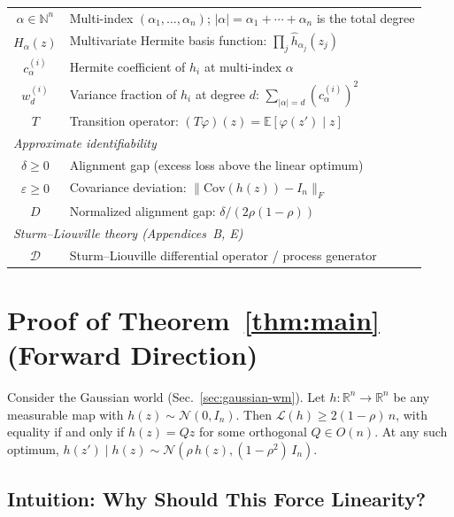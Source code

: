 {\begin{center}
\begin{tabular}{cl}
$\alpha \in \mathbb{N}^n$ & Multi-index $(\alpha_1, \ldots, \alpha_n)$; $|\alpha| = \alpha_1 + \cdots + \alpha_n$ is the total degree \\
$H_\alpha(z)$ & Multivariate Hermite basis function: $\prod_j \hat{h}_{\alpha_j}(z_j)$ \\
$c_\alpha^{(i)}$ & Hermite coefficient of $h_i$ at multi-index $\alpha$ \\
$w_d^{(i)}$ & Variance fraction of $h_i$ at degree $d$: $\sum_{|\alpha|=d} (c_\alpha^{(i)})^2$ \\
$T$ & Transition operator: $(T\varphi)(z) = \mathbb{E}[\varphi(z') \mid z]$ \\
\midrule
\multicolumn{2}{l}{\textit{Approximate identifiability}} \\
$\delta \geq 0$ & Alignment gap (excess loss above the linear optimum) \\
$\varepsilon \geq 0$ & Covariance deviation: $\|\mathrm{Cov}(h(z)) - I_n\|_F$ \\
$D$ & Normalized alignment gap: $\delta / (2\rho(1-\rho))$ \\
\midrule
\multicolumn{2}{l}{\textit{Sturm--Liouville theory (Appendices~B, E)}} \\
$\mathcal{D}$ & Sturm--Liouville differential operator / process generator \\
\bottomrule
\end{tabular}
\end{center}
}







\section{Proof of Theorem~\ref{thm:main} (Forward Direction)}\label{app:proof-forward}

\begin{theoremrestate}
Consider the Gaussian world (Sec.~\ref{sec:gaussian-wm}). Let $h: \mathbb{R}^n \to \mathbb{R}^n$ be any measurable map with $h(z) \sim \mathcal{N}(0, I_n)$. Then $\mathcal{L}(h) \geq 2(1-\rho)\,n$, with equality if and only if $h(z) = Qz$ for some orthogonal $Q \in O(n)$. At any such optimum, $h(z') \mid h(z) \sim \mathcal{N}(\rho\, h(z), (1-\rho^2)\,I_n)$.
\end{theoremrestate}


\subsection{Intuition: Why Should This Force Linearity?}

